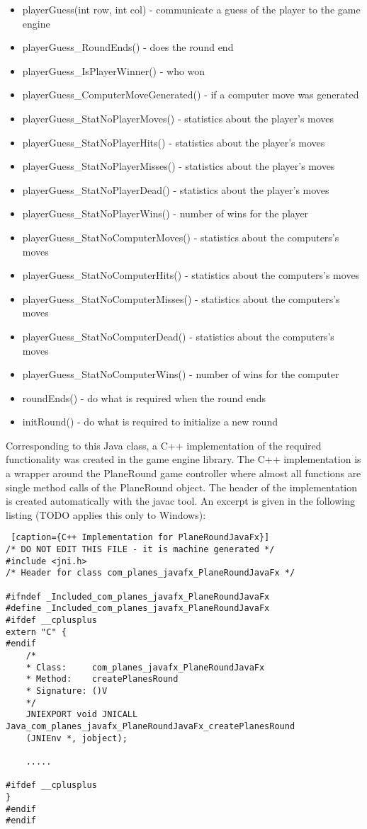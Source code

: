 \begin{itemize}
	\item playerGuess(int row, int col) - communicate a guess of the player to the game engine
	\item playerGuess\_RoundEnds() - does the round end
	\item playerGuess\_IsPlayerWinner() - who won
	\item playerGuess\_ComputerMoveGenerated() - if a computer move was generated
	\item playerGuess\_StatNoPlayerMoves() - statistics about the player's moves
	\item playerGuess\_StatNoPlayerHits() - statistics about the player's moves
	\item playerGuess\_StatNoPlayerMisses() - statistics about the player's moves
	\item playerGuess\_StatNoPlayerDead() - statistics about the player's moves
	\item playerGuess\_StatNoPlayerWins() - number of wins for the player
	\item playerGuess\_StatNoComputerMoves() - statistics about the computers's moves
	\item playerGuess\_StatNoComputerHits() - statistics about the computers's moves
	\item playerGuess\_StatNoComputerMisses() - statistics about the computers's moves
	\item playerGuess\_StatNoComputerDead() - statistics about the computers's moves
	\item playerGuess\_StatNoComputerWins() - number of wins for the computer
	
	\item roundEnds() - do what is required when the round ends
	\item initRound() - do what is required to initialize a new round

\end{itemize}

Corresponding to this Java class, a C++ implementation of the required functionality was created in the game engine library. The C++ implementation is a wrapper around the PlaneRound game controller where almost all functions are single method calls of the PlaneRound object. The header of the implementation is created automatically with the javac tool. An excerpt is given in the following listing (TODO applies this only to Windows):

\begin{lstlisting} [caption={C++ Implementation for PlaneRoundJavaFx}]
/* DO NOT EDIT THIS FILE - it is machine generated */
#include <jni.h>
/* Header for class com_planes_javafx_PlaneRoundJavaFx */

#ifndef _Included_com_planes_javafx_PlaneRoundJavaFx
#define _Included_com_planes_javafx_PlaneRoundJavaFx
#ifdef __cplusplus
extern "C" {
#endif
	/*
	* Class:     com_planes_javafx_PlaneRoundJavaFx
	* Method:    createPlanesRound
	* Signature: ()V
	*/
	JNIEXPORT void JNICALL Java_com_planes_javafx_PlaneRoundJavaFx_createPlanesRound
	(JNIEnv *, jobject);
	
	.....

#ifdef __cplusplus
}
#endif
#endif

\end{lstlisting}

